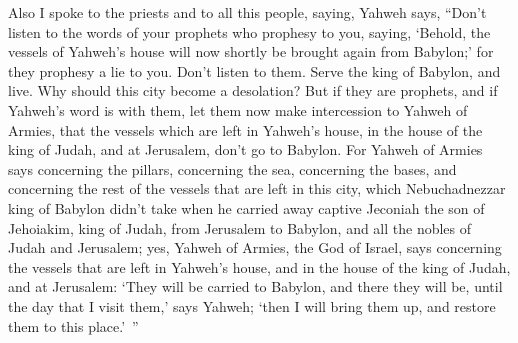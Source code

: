 {\par }{\PP {}Also I spoke to the priests and to all this people, saying, Yahweh says, “Don’t listen to the words of your prophets who prophesy to you, saying, ‘Behold, the vessels of Yahweh’s house will now shortly be brought again from Babylon;’ for they prophesy a lie to you.
Don’t listen to them. Serve the king of Babylon, and live. Why should this city become a desolation?
But if they are prophets, and if Yahweh’s word is with them, let them now make intercession to Yahweh of Armies, that the vessels which are left in Yahweh’s house, in the house of the king of Judah, and at Jerusalem, don’t go to Babylon.
For Yahweh of Armies says concerning the pillars, concerning the sea, concerning the bases, and concerning the rest of the vessels that are left in this city,
which Nebuchadnezzar king of Babylon didn’t take when he carried away captive Jeconiah the son of Jehoiakim, king of Judah, from Jerusalem to Babylon, and all the nobles of Judah and Jerusalem;
yes, Yahweh of Armies, the God of Israel, says concerning the vessels that are left in Yahweh’s house, and in the house of the king of Judah, and at Jerusalem:
‘They will be carried to Babylon, and there they will be, until the day that I visit them,’ says Yahweh; ‘then I will bring them up, and restore them to this place.’ ”

}
